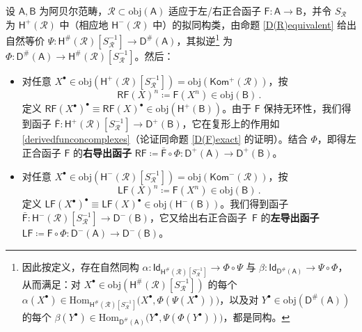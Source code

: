 \begin{Def}\label{derivedfunc}
	设 $\mathsf{A}, \mathsf{B}$ 为阿贝尔范畴，$\mathcal{R}\subset\text{obj}(\mathsf{A})$ 适应于左/右正合函子 $\mathsf{F}:\mathsf{A}\rightarrow\mathsf{B}$，并令 $S_\mathcal{R}$ 为 $\mathsf{H^+(\mathcal{R})}$ 中（相应地 $\mathsf{H^-(\mathcal{R})}$ 中）的拟同构类，由命题 \ref{D(R)equivalent} 给出自然等价 $\Psi:\mathsf{H^\#\!(\mathcal{R})}[S_\mathcal{R}^{-1}]\rightarrow\mathsf{D^\#\!(A)}$，其拟逆\footnote{因此按定义，存在自然同构 $\alpha:\mathsf{Id}_{\mathsf{H^\#\!(\mathcal{R})}[S_\mathcal{R}^{-1}]}\rightarrow\Phi\circ\Psi$ 与 $\beta:\mathsf{Id}_{\mathsf{D^\#\!(A)}}\rightarrow\Psi\circ\Phi$，从而满足：对 $X^\bullet\in\text{obj}(\mathsf{H^\#\!(\mathcal{R})}[S_\mathcal{R}^{-1}])$ 的每个 $\alpha({X^\bullet})\in\text{Hom}_{\mathsf{H^\#\!(\mathcal{R})}[S_\mathcal{R}^{-1}]}\big(X^\bullet, \Phi(\Psi(X^\bullet))\big)$，以及对 $Y^\bullet\in\text{obj}(\mathsf{D^\#\!(A)})$ 的每个 $\beta({Y^\bullet})\in\text{Hom}_\mathsf{D^\#\!(A)}\big(Y^\bullet,\Psi(\Phi(Y^\bullet))\big)$，都是同构。} 为 $\Phi:\mathsf{D^\#\!(A)}\rightarrow\mathsf{H^\#\!(\mathcal{R})}[S_\mathcal{R}^{-1}]$。然后：
	\begin{itemize}[leftmargin=0.5cm]
		\item 对任意 $X^\bullet\in\text{obj}(\mathsf{H^+(\mathcal{R})}[S_\mathcal{R}^{-1}])=\text{obj}(\mathsf{Kom^+(\mathcal{R})})$，按 \begin{equation}\label{derivedfunconcomplexes}
			\mathsf{RF}(X)^n\coloneqq\mathsf{F}(X^n)\in\text{obj}(\mathsf{B})\,.
		\end{equation}
		定义 $\mathsf{RF}(X^\bullet)^\bullet\equiv\mathsf{RF}(X)^\bullet\in\text{obj}(\mathsf{H^+(B)})$。由于 $\mathsf{F}$ 保持无环性，我们得到函子 $\bar{\mathsf{F}}:\mathsf{H^+(\mathcal{R})}[S_\mathcal{R}^{-1}]\rightarrow \mathsf{D^+(B)}$，它在复形上的作用如 \eqref{derivedfunconcomplexes}（论证同命题 \ref{D(F)exact} 的证明）。结合 $\Phi$，即得左正合函子 $\mathsf{F}$ 的\textbf{右导出函子} $\mathsf{RF}\coloneqq\bar{\mathsf{F}}\circ\Phi:\mathsf{D^+(A)}\rightarrow\mathsf{D^+(B)}$。
		
		\item 对任意 $X^\bullet\in\text{obj}(\mathsf{H^-(\mathcal{R})}[S_\mathcal{R}^{-1}])=\text{obj}(\mathsf{Kom^-(\mathcal{R})})$，按
		\begin{equation}
			\mathsf{LF}(X)^n\coloneqq\mathsf{F}(X^n)\in\text{obj}(\mathsf{B})\,.
		\end{equation}
		定义 $\mathsf{LF}(X^\bullet)^\bullet\equiv\mathsf{LF}(X)^\bullet\in\text{obj}(\mathsf{H^-(B)})$。我们得到函子 $\bar{\mathsf{F}}:\mathsf{H^-(\mathcal{R})}[S_\mathcal{R}^{-1}]\rightarrow \mathsf{D^-(B)}$，它又给出右正合函子~$\mathsf{F}$ 的\textbf{左导出函子} $\mathsf{LF}\coloneqq\mathsf{F}\circ\Phi:\mathsf{D^-(A)}\rightarrow\mathsf{D^-(B)}$。
	\end{itemize}
\end{Def}

